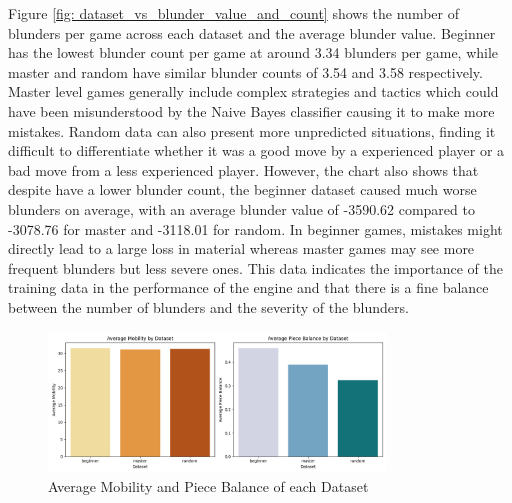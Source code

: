 Figure \ref{fig: dataset_vs_blunder_value_and_count} shows the number of blunders per game across each dataset and the average blunder value. Beginner has the lowest blunder count per game at around 3.34 blunders per game, while master and random have similar blunder counts of 3.54 and 3.58 respectively. Master level games generally include complex strategies and tactics which could have been misunderstood by the Naive Bayes classifier causing it to make more mistakes. Random data can also present more unpredicted situations, finding it difficult to differentiate whether it was a good move by a experienced player or a bad move from a less experienced player. However, the chart also shows that despite have a lower blunder count, the beginner dataset caused much worse blunders on average, with an average blunder value of -3590.62 compared to -3078.76 for master and -3118.01 for random. In beginner games, mistakes might directly lead to a large loss in material whereas master games may see more frequent blunders but less severe ones. This data indicates the importance of the training data in the performance of the engine and that there is a fine balance between the number of blunders and the severity of the blunders.









\begin{figure}
    \centering
    \includegraphics[width=0.8\textwidth]{images/plots/dataset/Dataset_vs_mobility_and_piece_balance.png}
    \caption{Average Mobility and Piece Balance of each Dataset}
    \label{fig: dataset_vs_mobility_and_piece_balance}
\end{figure}

